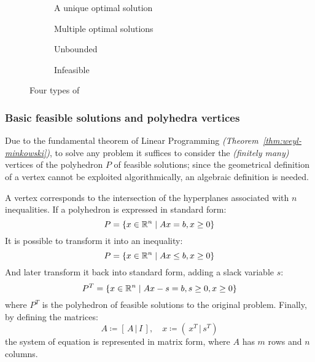 \documentclass[english]{article}
\begin{document}
\begin{figure}[htbp]
  \bigskip
  \centering
  \begin{subfigure}[b]{0.495\textwidth}
    \bigskip
    \centering
    \caption{A unique optimal solution}
    \label{subfig:unique-solution}
    \bigskip
  \end{subfigure}
  \begin{subfigure}[b]{0.495\textwidth}
    \bigskip
    \centering
    \caption{Multiple optimal solutions}
    \label{subfig:multiple-solutions}
    \bigskip
  \end{subfigure}
  \bigskip
  \begin{subfigure}[b]{0.495\textwidth}
    \bigskip
    \centering
    \caption{Unbounded \LP}
    \label{subfig:unbounded-lp}
    \bigskip
  \end{subfigure}
  \begin{subfigure}[b]{0.495\textwidth}
    \bigskip
    \centering
    \caption{Infeasible \LP}
    \label{subfig:infeasible-lp}
    \bigskip
  \end{subfigure}
  \caption{Four types of \LP}
  \label{fig:lp-types}
  \bigskip
\end{figure}

\subsubsection{Basic feasible solutions and polyhedra vertices}

Due to the fundamental theorem of Linear Programming \textit{(Theorem~\ref{thm:weyl-minkowski})}, to solve any \LP problem it suffices to consider the \textit{(finitely many)} vertices of the polyhedron \(P\) of feasible solutions;
since the geometrical definition of a vertex cannot be exploited algorithmically, an algebraic definition is needed.

A vertex corresponds to the intersection of the hyperplanes associated with \(n\) inequalities.
If a polyhedron is expressed in standard form:
\[ P = \left\{ x \in \mathbb{R}^n \mid  Ax = b, x \geq 0 \right\}\]
It is possible to transform it into an inequality:
\[ P = \left\{ x \in \mathbb{R}^n \mid  Ax \leq b, x \geq 0 \right\}\]
And later transform it back into standard form, adding a slack variable \(s\):
\[ P^T = \left\{ x \in \mathbb{R}^n \mid   Ax -s = b, s \geq 0, x \geq 0 \right\} \]
where \(P^T\) is the polyhedron of feasible solutions to the original problem.
Finally, by defining the matrices:
\[ A \coloneqq \left[ \, A \,|\, I \, \right], \quad x \coloneqq \left( \, x^T \,|\, s^T \right) \]
the system of equation is represented in matrix form, where \(A\) has \(m\) rows and \(n\) columns.
\end{document}
